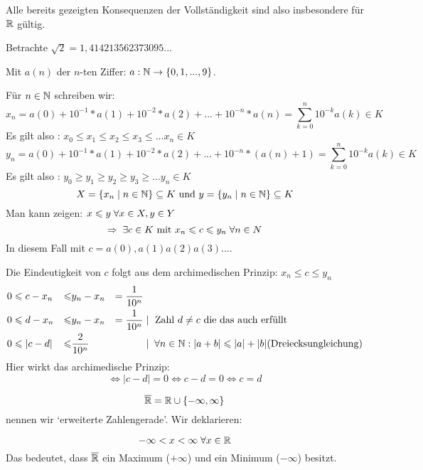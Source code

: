 \documentclass[main.tex]{subfiles}
\begin{document}
\begin{Bemerkung}
  Alle bereits gezeigten Konsequenzen der Vollständigkeit sind also insbesondere für $\mathbb{R}$ gültig.
\end{Bemerkung}

\begin{Beispiel}
  Betrachte $\sqrt{2} = 1,414213562373095...$

  Mit $a(n)$ der $n$-ten Ziffer: $a: \mathbb{N} \to \{ 0,1,...,9\}$.

  Für $n\in\mathbb{N}$ schreiben wir:
  $$x_n = a(0) + 10^{-1}*a(1)+ 10^{-2}*a(2)+...+ 10^{-n}*a(n) = \sum \limits_{k=0}^n 10^{-k}a(k)\in K$$
  Es gilt also : $x_0 \leq x_1 \leq x_2 \leq x_3 \leq ... x_n \in K$
  $$y_n = a(0) + 10^{-1}*a(1)+ 10^{-2}*a(2)+...+ 10^{-n}*(a(n)+1) = \sum \limits_{k=0}^n 10^{-k}a(k)\in K$$
  Es gilt also : $y_0 \geq y_1 \geq y_2 \geq y_3 \geq ... y_n \in K$
  $$X = \{x_n \mid n \in \mathbb{N}\}\subseteq K \text{ und } y = \{y_n \mid n \in \mathbb{N}\}\subseteq K$$
  Man kann zeigen: $x \leqslant y \;\forall x \in X, y \in Y$
  $$\Rightarrow \;\exists c\in K \text{ mit } x_n \leqslant c \leqslant y_n \;\forall n\in N$$
  In diesem Fall mit $c = a(0), a(1)a(2)a(3)...$.

  Die Eindeutigkeit von $c$ folgt aus dem archimedischen Prinzip: $x_n \leq c \leq y_n$
  $$\begin{aligned}
    0 &\leqslant c - x_n  &\leqslant& y_n - x_n      &= \dfrac{1}{10^n}  & \\
    0 &\leqslant d - x_n  &\leqslant& y_n - x_n      &= \dfrac{1}{10^n}  & \mid \text{ Zahl $d \neq c$ die das auch erfüllt} \\
    0 &\leqslant |c - d|  &\leqslant& \dfrac{2}{10^n}&                   & \mid \;\forall n\in \mathbb{N} : |a+b| \leqslant |a|+|b| \text{(Dreiecksungleichung)}\\
  \end{aligned}$$
  Hier wirkt das archimedische Prinzip:
  $$\Leftrightarrow |c-d| = 0 \Leftrightarrow c -d = 0 \Leftrightarrow c = d$$
\end{Beispiel}

\begin{Definition}[$\overline{\R}$]
  $$\overline{\mathbb{R}} = \mathbb{R} \cup \{-\infty,\infty\}$$
  nennen wir `erweiterte Zahlengerade'.
  Wir deklarieren:
  \begin{Theorem}[Ordnungsrelation]
    $$-\infty < x < \infty \;\forall x \in \mathbb{R}$$
    Das bedeutet, dass $\overline{\R}$ ein Maximum ($+\infty$) und ein Minimum ($-\infty$) besitzt.
  \end{Theorem}
\end{Definition}
\end{document}
